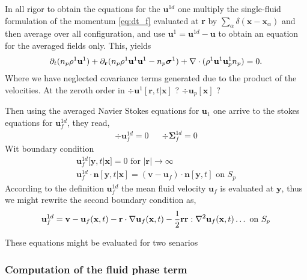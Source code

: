 In all rigor to obtain the equations for the $\textbf{u}^{1d}$ one multiply the single-fluid formulation of the momentum \eqref{eq:dt_f} evaluated at \textbf{r} by $\sum_\alpha \delta(\textbf{x}-\textbf{x}_\alpha)$ and then average over all configuration,  and use $\textbf{u}^1 = \textbf{u}^{1d} - \textbf{u}$ to obtain an equation for the averaged fields only. 
This, yields
\begin{equation*}
    \partial_t (n_p \rho^1 \textbf{u}^1)
    + {\partial_\textbf{r}}  (
        n_p \rho^1 \textbf{u}^1  \textbf{u}^1 
        - n_p \bm\sigma^1
        )
    + \mathbf{\nabla}\cdot (\rho^1 \textbf{u}^1 \textbf{u}_p^1  n_p )
    = 0. 
\end{equation*}
Where we have neglected covariance terms generated due to the product of the velocities.
At the zeroth order in $\div \textbf{u}^1[\textbf{r},t|\textbf{x}]$ ? $\div \textbf{u}_p[\textbf{x}]$ ? 

Then using the averaged Navier Stokes equations for $\textbf{u}_1$ one arrive to the stokes equations for $\textbf{u}_f^{1d}$, they read, 
\begin{align*}
    \div \textbf{u}_f^{1d} = 0 &&
    \div \bm\Sigma_f^{1d} = 0 
\end{align*}
Wit boundary condition 
\begin{align*}
    \textbf{u}_f^{1d}[\textbf{y},t|\textbf{x}] = 0 \text{  for  } |\textbf{r}| \to \infty\\
    \textbf{u}_f^{1d}\cdot \textbf{n}[\textbf{y},t|\textbf{x}] = (\textbf{v} - \textbf{u}_f)\cdot \textbf{n}[\textbf{y},t]\text{  on  } S_p
\end{align*}
According to the definition $\textbf{u}_f^{1d}$ the mean fluid velocity $\textbf{u}_f$ is evaluated at $\textbf{y}$, thus we might rewrite the second boundary condition as, 
\begin{align*}
    \textbf{u}_f^{1d} = \textbf{v} - \textbf{u}_f(\textbf{x},t)
    -\textbf{r}\cdot\mathbf{\nabla}\textbf{u}_f(\textbf{x},t)
    -\frac{1}{2}\textbf{rr}:\mathbf{\nabla}^2\textbf{u}_f(\textbf{x},t)
    \ldots
    \text{  on  } S_p
\end{align*}

These equations might be evaluated for two senarios

\subsubsection*{Computation of the fluid phase term}

